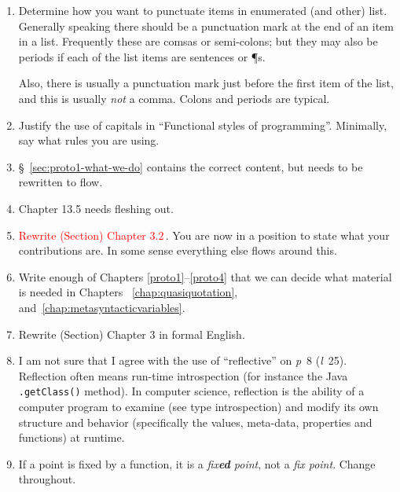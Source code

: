 \begin{scope}
\begin{enumerate}
\item \label{item:5}
  Determine how you want to punctuate items in enumerated (and other)
  list.
  Generally speaking there should be a punctuation mark at the end of an
  item in a list.
  Frequently these are comsas or semi-colons; but they may also be
  periods if each of the list items are sentences or \P{}s.

  Also, there is usually a punctuation mark just before the first item
  of the list, and this is usually \textit{not} a comma.  Colons and
  periods are typical.

\item
  Justify the use of capitals in ``Functional styles of programming''.
  Minimally, say what rules you are using.
\item
  \S~\ref{sec:proto1-what-we-do} contains the correct content, but needs
  to be rewritten to flow.
\item
  Chapter 13.5 needs fleshing out.

\item
  \textcolor{red}{Rewrite (Section) Chapter 3.2}\,.
  You are now in a position to state what your contributions are.
  In some sense everything else flows around this.

\item
  Write enough of Chapters \ref{proto1}--\ref{proto4} that we can decide
  what material is needed in Chapters~ \ref{chap:quasiquotation},
  and~\ref{chap:metasyntacticvariables}.

\item
  Rewrite (Section) Chapter 3 in formal English.

\item
  I am not sure that I agree with the use of ``reflective'' on
  \textit{p}~8 (\textit{l}~25).  Reflection often means run-time
  introspection (for instance the Java \Verb!.getClass()! method).
  In computer science, reflection is the ability of a computer program to examine (see type introspection) and modify its own structure and behavior (specifically the values, meta-data, properties and functions) at runtime.
  
\item
  If a point is fixed by a function, it is a \textsl{fix\textbf{ed}
    point}, not a \textit{fix point}.  Change throughout.


\end{enumerate}
\end{scope}
